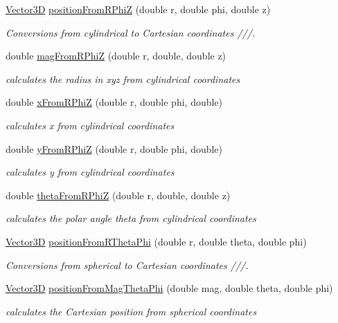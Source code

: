 \begin{DoxyCompactItemize}
\hyperlink{struct_d_d4hep_1_1_d_d_segmentation_1_1_vector3_d}{Vector3D} \hyperlink{namespace_d_d4hep_1_1_d_d_segmentation_1_1_util_a26afeef0487b44d0d1c634f43e1de11a}{position\+From\+R\+PhiZ} (double r, double phi, double z)
\begin{DoxyCompactList}\small\item\em Conversions from cylindrical to Cartesian coordinates ///. \end{DoxyCompactList}\item 
double \hyperlink{namespace_d_d4hep_1_1_d_d_segmentation_1_1_util_aa316184b02cf82f628558fc2f543d973}{mag\+From\+R\+PhiZ} (double r, double, double z)
\begin{DoxyCompactList}\small\item\em calculates the radius in xyz from cylindrical coordinates \end{DoxyCompactList}\item 
double \hyperlink{namespace_d_d4hep_1_1_d_d_segmentation_1_1_util_aef69bb74835c52ef738740d16db3343e}{x\+From\+R\+PhiZ} (double r, double phi, double)
\begin{DoxyCompactList}\small\item\em calculates x from cylindrical coordinates \end{DoxyCompactList}\item 
double \hyperlink{namespace_d_d4hep_1_1_d_d_segmentation_1_1_util_a7c2700f5933a62c0f9f2977adfbf6deb}{y\+From\+R\+PhiZ} (double r, double phi, double)
\begin{DoxyCompactList}\small\item\em calculates y from cylindrical coordinates \end{DoxyCompactList}\item 
double \hyperlink{namespace_d_d4hep_1_1_d_d_segmentation_1_1_util_a810a2371a6bb37d88321f100026f35c3}{theta\+From\+R\+PhiZ} (double r, double, double z)
\begin{DoxyCompactList}\small\item\em calculates the polar angle theta from cylindrical coordinates \end{DoxyCompactList}\item 
\hyperlink{struct_d_d4hep_1_1_d_d_segmentation_1_1_vector3_d}{Vector3D} \hyperlink{namespace_d_d4hep_1_1_d_d_segmentation_1_1_util_a9da66f5c45a3396609860916f296ae0c}{position\+From\+R\+Theta\+Phi} (double r, double theta, double phi)
\begin{DoxyCompactList}\small\item\em Conversions from spherical to Cartesian coordinates ///. \end{DoxyCompactList}\item 
\hyperlink{struct_d_d4hep_1_1_d_d_segmentation_1_1_vector3_d}{Vector3D} \hyperlink{namespace_d_d4hep_1_1_d_d_segmentation_1_1_util_a7856bceaaa7bcfa56ad6fe03ef007f8e}{position\+From\+Mag\+Theta\+Phi} (double mag, double theta, double phi)
\begin{DoxyCompactList}\small\item\em calculates the Cartesian position from spherical coordinates \end{DoxyCompactList}\end{DoxyCompactItemize}


